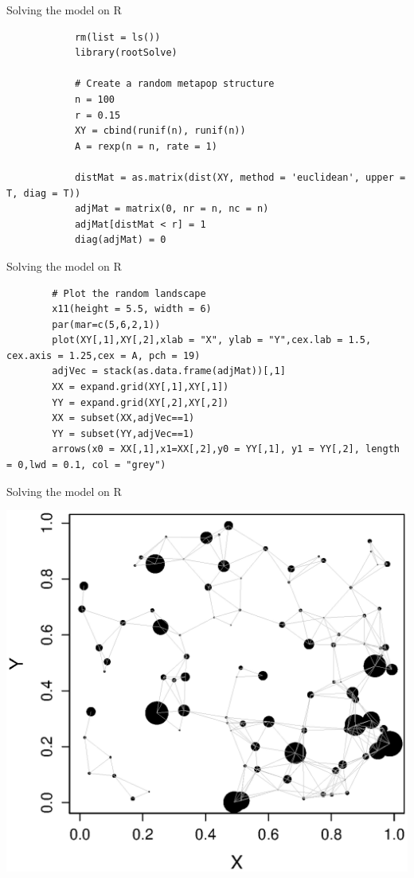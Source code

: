 \documentclass{eecslides}
\begin{document}
	\begin{frame}[fragile]{Solving the model on R}
		\begin{lstlisting}
			rm(list = ls())
			library(rootSolve)

			# Create a random metapop structure
			n = 100
			r = 0.15
			XY = cbind(runif(n), runif(n))
			A = rexp(n = n, rate = 1)

			distMat = as.matrix(dist(XY, method = 'euclidean', upper = T, diag = T))
			adjMat = matrix(0, nr = n, nc = n)
			adjMat[distMat < r] = 1
			diag(adjMat) = 0
		\end{lstlisting}
	\end{frame}
	

	\begin{frame}[fragile]{Solving the model on R}
		\begin{lstlisting}
		# Plot the random landscape
		x11(height = 5.5, width = 6)
		par(mar=c(5,6,2,1))
		plot(XY[,1],XY[,2],xlab = "X", ylab = "Y",cex.lab = 1.5, cex.axis = 1.25,cex = A, pch = 19)
		adjVec = stack(as.data.frame(adjMat))[,1]
		XX = expand.grid(XY[,1],XY[,1])
		YY = expand.grid(XY[,2],XY[,2])
		XX = subset(XX,adjVec==1)
		YY = subset(YY,adjVec==1)
		arrows(x0 = XX[,1],x1=XX[,2],y0 = YY[,1], y1 = YY[,2], length = 0,lwd = 0.1, col = "grey")
		\end{lstlisting}
	\end{frame}
	

	\begin{frame}{Solving the model on R}
		\begin{center}
			\includegraphics[height=0.7\textheight]{spatial_network}
		\end{center}
	\end{frame}
	
\end{document}

